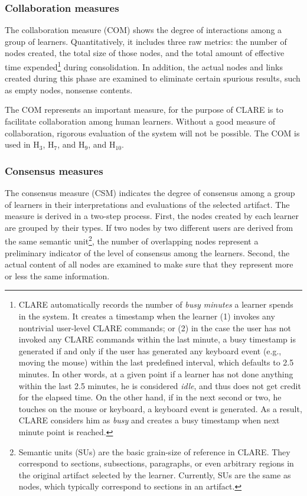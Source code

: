 \subsubsection{Collaboration measures}

The collaboration measure (COM) shows the degree of interactions among a
group of learners. Quantitatively, it includes three raw metrics: the
number of nodes created, the total size of those nodes, and the total
amount of effective time expended\footnote{CLARE automatically records the
number of {\it busy minutes\/} a learner spends in the system. It creates a
timestamp when the learner (1) invokes any nontrivial user-level CLARE
commands; or (2) in the case the user has not invoked any CLARE commands
within the last minute, a busy timestamp is generated if and only if the
user has generated any keyboard event (e.g., moving the mouse) within the
last predefined interval, which defaults to 2.5 minutes.  In other words,
at a given point if a learner has not done anything within the last 2.5
minutes, he is considered {\it idle\/}, and thus does not get credit for
the elapsed time. On the other hand, if in the next second or two, he
touches on the mouse or keyboard, a keyboard event is generated.  As a
result, CLARE considers him as {\it busy\/} and creates a busy timestamp
when next minute point is reached.} during consolidation. In addition, the
actual nodes and links created during this phase are examined to eliminate
certain spurious results, such as empty nodes, nonsense contents.

The COM represents an important measure, for the purpose of CLARE is to
facilitate collaboration among human learners.  Without a good measure of
collaboration, rigorous evaluation of the system will not be possible. The
COM is used in {\sf H\(_3\)\/}, {\sf H\(_7\)\/}, and {\sf H\(_9\)\/}, and
{\sf H\(_{10}\)\/}.


\subsubsection{Consensus measures}

The consensus measure (CSM) indicates the degree of consensus among a group
of learners in their interpretations and evaluations of the selected
artifact. The measure is derived in a two-step process.  First, the nodes
created by each learner are grouped by their types. If two nodes by two
different users are derived from the same semantic unit\footnote{Semantic units
(SUs) are the basic grain-size of reference in CLARE. They correspond to
sections, subsections, paragraphs, or even arbitrary regions in the
original artifact selected by the learner.  Currently, SUs are the same as
nodes, which typically correspond to sections in an artifact.}, the number
of overlapping nodes represent a preliminary indicator of the level of
consensus among the learners. Second, the actual content of all nodes are
examined to make sure that they represent more or less the same
information.

